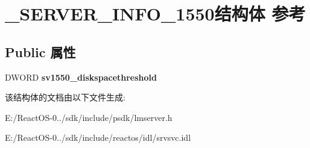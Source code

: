 \hypertarget{struct___s_e_r_v_e_r___i_n_f_o__1550}{}\section{\+\_\+\+S\+E\+R\+V\+E\+R\+\_\+\+I\+N\+F\+O\+\_\+1550结构体 参考}
\label{struct___s_e_r_v_e_r___i_n_f_o__1550}
\subsection*{Public 属性}
\begin{DoxyCompactItemize}
\item 
\mbox{\label{struct___s_e_r_v_e_r___i_n_f_o__1550_a8214a7e6d1cb70766cfc8e128f4cae66}} 
D\+W\+O\+RD {\bfseries sv1550\+\_\+diskspacethreshold}
\end{DoxyCompactItemize}


该结构体的文档由以下文件生成\+:\begin{DoxyCompactItemize}
\item 
E\+:/\+React\+O\+S-\/0../sdk/include/psdk/lmserver.\+h\item 
E\+:/\+React\+O\+S-\/0../sdk/include/reactos/idl/srvsvc.\+idl\end{DoxyCompactItemize}
